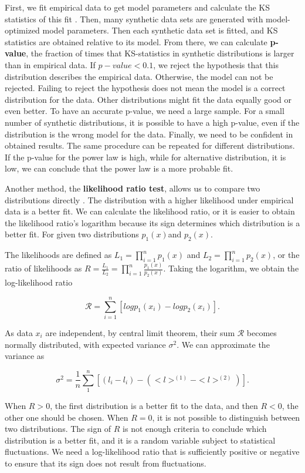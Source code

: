First, we fit empirical data to get model parameters and calculate the KS statistics of this fit \cite{clauset2009power}. Then, many synthetic data sets are generated with model-optimized model parameters. Then each synthetic data set is fitted, and KS statistics are obtained relative to its model. From there, we can calculate \textbf{p-value}, the fraction of times that KS-statistics in synthetic distributions is larger than in empirical data.  If $p-value<0.1$, we reject the hypothesis that this distribution describes the empirical data. Otherwise, the model can not be rejected. Failing to reject the hypothesis does not mean the model is a correct distribution for the data. Other distributions might fit the data equally good or even better. To have an accurate p-value, we need a large sample. For a small number of synthetic distributions, it is possible to have a high p-value, even if the distribution is the wrong model for the data. Finally, we need to be confident in obtained results. The same procedure can be repeated for different distributions. If the p-value for the power law is high, while for alternative distribution, it is low, we can conclude that the power law is a more probable fit. 

Another method, the \textbf{likelihood ratio test}, allows us to compare two distributions directly \cite{clauset2009power}. The distribution with a higher likelihood under empirical data is a better fit. We can calculate the likelihood ratio, or it is easier to obtain the likelihood ratio's logarithm because its sign determines which distribution is a better fit. For given two distributions $p_1(x)$and $p_2(x)$. 

The likelihoods are defined as $L_1=\prod_{i=1}^{n}p_1(x)$ and $L_2=\prod_{i=1}^{n}p_2(x)$, or the ratio of likelihoods as $R=\frac{L_1}{L_2} = \prod_{i=1}^{n} \frac{p_1(x)}{p_2(x)}$. Taking the logarithm, we obtain the log-likelihood ratio

\begin{equation}
\mathcal{R} = \sum_{i=1}^{n} \left[log p_1(x_i) - log p_2(x_i)\right].
\end{equation}

As data $x_i$ are independent, by central limit theorem, their sum $\mathcal{R}$ becomes normally distributed, with expected variance $\sigma^2$. We can approximate the variance as 

$$\sigma^2 = \frac{1}{n}\sum_{1}^{n}[(l_i - l_i) - (<l>^{(1)}- <l>^{(2)})].$$

When $R>0$, the first distribution is a better fit to the data, and then $R<0$, the other one should be chosen. When $R=0$, it is not possible to distinguish between two distributions. The sign of $R$ is not enough criteria to conclude which distribution is a better fit, and it is a random variable subject to statistical fluctuations. We need a log-likelihood ratio that is sufficiently positive or negative to ensure that its sign does not result from fluctuations.

